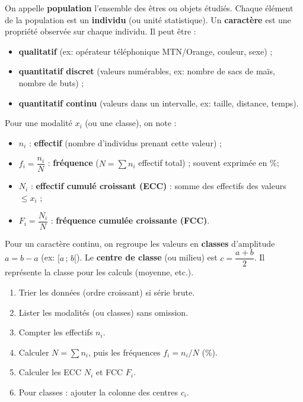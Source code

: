 \documentclass[11pt]{article}
\begin{document}
\begin{definition}
On appelle \textbf{population} l'ensemble des êtres ou objets étudiés. Chaque élément de la population est un \textbf{individu} (ou unité statistique). Un \textbf{caractère} est une propriété observée sur chaque individu. Il peut être :
\begin{itemize}
    \item \textbf{qualitatif} (ex: opérateur téléphonique MTN/Orange, couleur, sexe) ;
    \item \textbf{quantitatif discret} (valeurs numérables, ex: nombre de sacs de maïs, nombre de buts) ;
    \item \textbf{quantitatif continu} (valeurs dans un intervalle, ex: taille, distance, temps).
\end{itemize}
\end{definition}

\begin{definition}
Pour une modalité $x_i$ (ou une classe), on note :
\begin{itemize}
    \item $n_i$ : \textbf{effectif} (nombre d'individus prenant cette valeur) ;
    \item $f_i = \dfrac{n_i}{N}$ : \textbf{fréquence} ($N = \sum n_i$ effectif total) ; souvent exprimée en \%;
    \item $N_i$ : \textbf{effectif cumulé croissant (ECC)} : somme des effectifs des valeurs $\le x_i$ ;
    \item $F_i = \dfrac{N_i}{N}$ : \textbf{fréquence cumulée croissante (FCC)}.
\end{itemize}
\end{definition}

\begin{propriete}
Pour un caractère continu, on regroupe les valeurs en \textbf{classes} d'amplitude $a = b-a$ (ex: $[a\,;\,b[$). Le \textbf{centre de classe} (ou milieu) est $c = \dfrac{a+b}{2}$. Il représente la classe pour les calculs (moyenne, etc.).
\end{propriete}

\begin{methode}
\begin{enumerate}
    \item Trier les données (ordre croissant) si série brute.
    \item Lister les modalités (ou classes) sans omission.
    \item Compter les effectifs $n_i$.
    \item Calculer $N = \sum n_i$, puis les fréquences $f_i = n_i/N$ (\%).
    \item Calculer les ECC $N_i$ et FCC $F_i$.
    \item Pour classes : ajouter la colonne des centres $c_i$.
\end{enumerate}
\end{methode}
\end{document}
